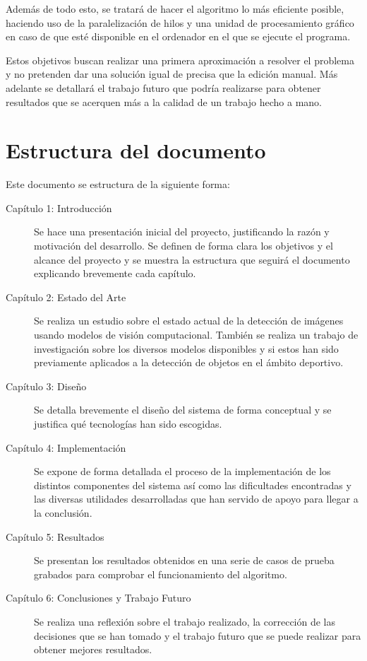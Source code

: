 Además de todo esto, se tratará de hacer el algoritmo lo más eficiente posible, haciendo uso de la paralelización de hilos y una unidad de procesamiento gráfico en caso de que esté disponible en el ordenador en el que se ejecute el programa.

Estos objetivos buscan realizar una primera aproximación a resolver el problema y no pretenden dar una solución igual de precisa que la edición manual. Más adelante se detallará el trabajo futuro que podría realizarse para obtener resultados que se acerquen más a la calidad de un trabajo hecho a mano.


\section[Estructura del documento]{Estructura del documento}

Este documento se estructura de la siguiente forma:

\begin{description}
	\item [Capítulo 1: Introducción] Se hace una presentación inicial del proyecto, justificando la razón y motivación del desarrollo. Se definen de forma clara los objetivos y el alcance del proyecto y se muestra la estructura que seguirá el documento explicando brevemente cada capítulo.
	\item [Capítulo 2: Estado del Arte] Se realiza un estudio sobre el estado actual de la detección de imágenes usando modelos de visión computacional. También se realiza un trabajo de investigación sobre los diversos modelos disponibles y si estos han sido previamente aplicados a la detección de objetos en el ámbito deportivo.
	\item [Capítulo 3: Diseño] Se detalla brevemente el diseño del sistema de forma conceptual y se justifica qué tecnologías han sido escogidas.
	\item [Capítulo 4: Implementación] Se expone de forma detallada el proceso de la implementación de los distintos componentes del sistema así como las dificultades encontradas y las diversas utilidades desarrolladas que han servido de apoyo para llegar a la conclusión.
	\item [Capítulo 5: Resultados] Se presentan los resultados obtenidos en una serie de casos de prueba grabados para comprobar el funcionamiento del algoritmo.
	\item [Capítulo 6: Conclusiones y Trabajo Futuro] Se realiza una reflexión sobre el trabajo realizado, la corrección de las decisiones que se han tomado y el trabajo futuro que se puede realizar para obtener mejores resultados.
\end{description}
